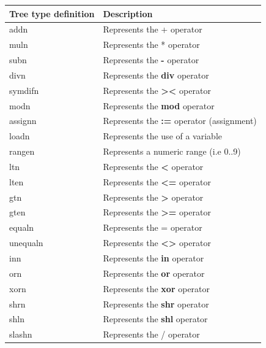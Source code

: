 \documentclass [a4paper,12pt]{article}
\begin{document}
\begin{longtable}{|l|p{10cm}|}
\hline
Tree type definition&
Description \\
\hline
\endhead
\hline
\endfoot
\textsf{addn}&
		\textsf{Represents the + operator} \\
\textsf{muln}&
		\textsf{Represents the * operator} \\
\textsf{subn}&
		\textsf{Represents the }\textsf{\textbf{-}}\textsf{ operator} \\
\textsf{divn}&
		\textsf{Represents the }\textsf{\textbf{div}}\textsf{ operator} \\
\textsf{symdifn}&
		\textsf{Represents the }\textsf{\textbf{><}}\textsf{ operator} \\
\textsf{modn}&
		\textsf{Represents the }\textsf{\textbf{mod}}\textsf{ operator} \\
\textsf{assignn}&
		\textsf{Represents the }\textsf{\textbf{:=}}\textsf{ operator (assignment)} \\
\textsf{loadn}&
		\textsf{Represents the use of a variable} \\
\textsf{rangen}&
		\textsf{Represents a numeric range (i.e 0..9)} \\
\textsf{ltn}&
		\textsf{Represents the }\textsf{\textbf{<}}\textsf{ operator} \\
\textsf{lten}&
		\textsf{Represents the }\textsf{\textbf{<=}}\textsf{ operator} \\
\textsf{gtn}&
		\textsf{Represents the }\textsf{\textbf{>}}\textsf{ operator} \\
\textsf{gten}&
		\textsf{Represents the }\textsf{\textbf{>=}}\textsf{ operator} \\
\textsf{equaln}& 	
		\textsf{Represents the = operator} \\
\textsf{unequaln}&
		\textsf{Represents the }\textsf{\textbf{<>}}\textsf{ operator} \\
\textsf{inn}&
		\textsf{Represents the }\textsf{\textbf{in}}\textsf{ operator} \\
\textsf{orn}&
		\textsf{Represents the }\textsf{\textbf{or}}\textsf{ operator} \\
\textsf{xorn}&
		\textsf{Represents the }\textsf{\textbf{xor}}\textsf{ operator} \\
\textsf{shrn}&
		\textsf{Represents the }\textsf{\textbf{shr}}\textsf{ operator} \\
\textsf{shln}&
		\textsf{Represents the }\textsf{\textbf{shl}}\textsf{ operator} \\
\textsf{slashn}&
		\textsf{Represents the / operator} \\

\end{longtable}
\end{document}
